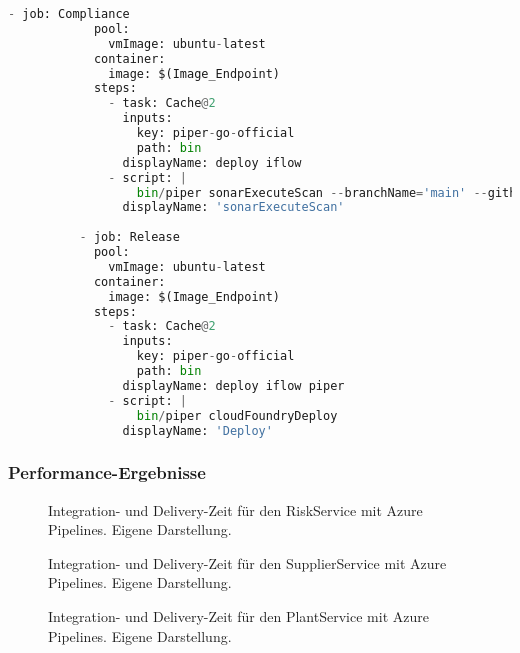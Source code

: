 \begin{lstlisting}[language=Python, breaklines=true, basicstyle=\small\ttfamily, frame=single]
          - job: Compliance
            pool:
              vmImage: ubuntu-latest
            container:
              image: $(Image_Endpoint)   
            steps:
              - task: Cache@2
                inputs:
                  key: piper-go-official
                  path: bin
                displayName: deploy iflow
              - script: |
                  bin/piper sonarExecuteScan --branchName='main' --githubToken=$(Github_Token) --token=$(Token) --serverUrl=$(serverUrl)
                displayName: 'sonarExecuteScan'
        
          - job: Release
            pool:
              vmImage: ubuntu-latest
            container:
              image: $(Image_Endpoint)   
            steps:
              - task: Cache@2
                inputs:
                  key: piper-go-official
                  path: bin
                displayName: deploy iflow piper
              - script: |
                  bin/piper cloudFoundryDeploy
                displayName: 'Deploy'
                \end{lstlisting}
\subsubsection{Performance-Ergebnisse}                
\begin{center}
	\begin{figure}[H]
		\centering
		\caption[]{Integration- und Delivery-Zeit für den RiskService mit Azure Pipelines. Eigene Darstellung.}
		\label{fig:AP_Risk}
	\end{figure}
\end{center}

\begin{center}
	\begin{figure}[H]
		\centering
		\caption[]{Integration- und Delivery-Zeit für den SupplierService mit Azure Pipelines. Eigene Darstellung.}
		\label{fig:AP_Supplier}
	\end{figure}
\end{center}
\begin{center}
	\begin{figure}[H]
		\centering
		\caption[]{Integration- und Delivery-Zeit für den PlantService mit Azure Pipelines. Eigene Darstellung.}
		\label{fig:AP_Plant}
	\end{figure}
\end{center}
                 
